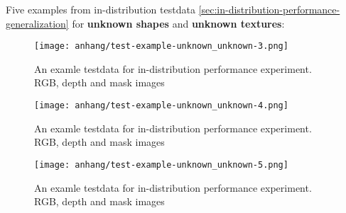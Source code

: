 	
	
	\FloatBarrier
	\clearpage
	Five examples from in-distribution testdata \ref{sec:in-distribution-performance-generalization} for \textbf{unknown shapes} and \textbf{unknown textures}:
	
	\begin{figure}[H]
		\centering
		\texttt{[image: anhang/test-example-unknown\_unknown-3.png]}
		\caption[An examle testdata for in-distribution performance experiment. RGB, depth and mask images]{An examle testdata for in-distribution performance experiment. RGB, depth and mask images}
	\end{figure}
	\begin{figure}[H]
		\centering
		\texttt{[image: anhang/test-example-unknown\_unknown-4.png]}
		\caption[An examle testdata for in-distribution performance experiment. RGB, depth and mask images]{An examle testdata for in-distribution performance experiment. RGB, depth and mask images}
	\end{figure}
	\begin{figure}[H]
		\centering
		\texttt{[image: anhang/test-example-unknown\_unknown-5.png]}
		\caption[An examle testdata for in-distribution performance experiment. RGB, depth and mask images]{An examle testdata for in-distribution performance experiment. RGB, depth and mask images}
	\end{figure}
	\fi
	

	

